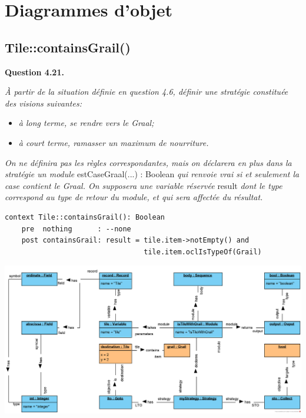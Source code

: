 \documentclass[oneside,a4paper]{book}
\begin{document}
\chapter{Diagrammes d'objet}

\section{Tile::containsGrail()}

\textbf{Question 4.21.}\label{Question 4.21.}\newline

\nopagebreak 

\textit{À partir de la situation définie en question 4.6, définir une stratégie constituée des visions suivantes:}
\begin{itemize}
    \item \textit{à long terme, se rendre vers le Graal;}
    \item \textit{à court terme, ramasser un maximum de nourriture.}
\end{itemize}
\textit{On ne définira pas les règles correspondantes, mais on déclarera en plus dans la stratégie un module} estCaseGraal(...) : Boolean\textit{ qui renvoie vrai si et seulement la case contient le Graal. On supposera une variable réservée} result\textit{ dont le type correspond au type de retour du module, et qui sera affectée du résultat.}

    \begin{lstlisting}
context Tile::containsGrail(): Boolean
    pre  nothing      : --none
    post containsGrail: result = tile.item->notEmpty() and 
                                 tile.item.oclIsTypeOf(Grail)
    \end{lstlisting}
    
\includegraphics[width=\textwidth,height=\textheight,keepaspectratio]{Diagrams/OD-Strategy.png}\newline
\end{document}
